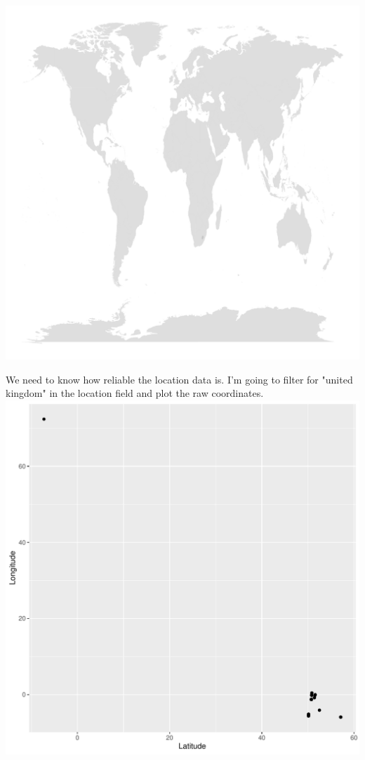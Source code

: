 \documentclass[10pt]{article}\usepackage[]{graphicx}\usepackage[]{color}
\makeatletter
\def\maxwidth{ %
  \ifdim\Gin@nat@width>\linewidth
    \linewidth
  \else
    \Gin@nat@width
  \fi
}
\newenvironment{kframe}{%
 \def\at@end@of@kframe{}%
 \ifinner\ifhmode%
  \def\at@end@of@kframe{\end{minipage}}%
  \begin{minipage}{\columnwidth}%
 \fi\fi%
 \def\FrameCommand##1{\hskip\@totalleftmargin \hskip-\fboxsep
 \colorbox{shadecolor}{##1}\hskip-\fboxsep
     \hskip-\linewidth \hskip-\@totalleftmargin \hskip\columnwidth}%
 \MakeFramed {\advance\hsize-\width
   \@totalleftmargin\z@ \linewidth\hsize
   \@setminipage}}%
 {\par\unskip\endMakeFramed%
 \at@end@of@kframe}
\newenvironment{knitrout}{}{} %
\makeatother
\begin{document}
\begin{itemize}
\begin{knitrout}
\begin{kframe}
{\ttfamily\noindent\color{warningcolor}{\#\# Warning: Computation failed in `stat\_binhex()`:\\\#\# Package `hexbin` required for `stat\_binhex`.\\\#\# Please install and try again.}}\end{kframe}
\includegraphics[width=\maxwidth]{figure/unnamed-chunk-16-1} 

\end{knitrout}

We need to know how reliable the location data is. I'm going to filter for "united kingdom" in the location field and plot the raw coordinates.
\begin{knitrout}
\color{fgcolor}
\includegraphics[width=\maxwidth]{figure/unnamed-chunk-17-1} 


\end{knitrout}
\end{itemize}
\end{document}
